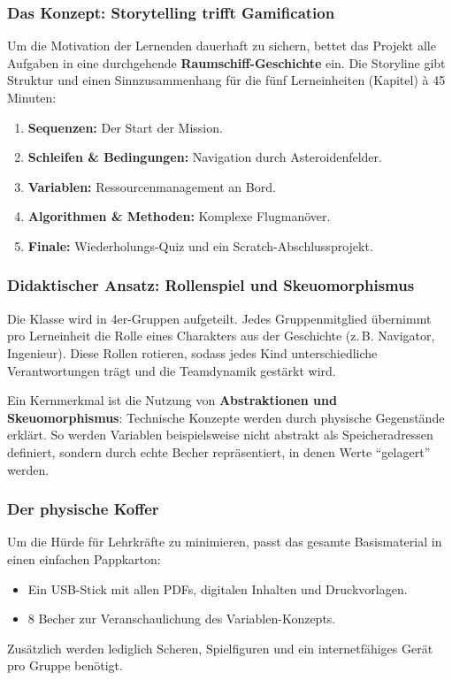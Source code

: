 \documentclass[a5paper,pagesize,10pt,bibtotoc,pointlessnumbers,
normalheadings,DIV=9,twoside=false]{scrbook}
\begin{document}
\subsubsection*{Das Konzept: Storytelling trifft Gamification}
Um die Motivation der Lernenden dauerhaft zu sichern, bettet das Projekt alle Aufgaben in eine durchgehende \textbf{Raumschiff-Geschichte} ein. Die Storyline gibt Struktur und einen Sinnzusammenhang für die fünf Lerneinheiten (Kapitel) à 45 Minuten:

\begin{enumerate}
    \item \textbf{Sequenzen:} Der Start der Mission.
    \item \textbf{Schleifen \& Bedingungen:} Navigation durch Asteroidenfelder.
    \item \textbf{Variablen:} Ressourcenmanagement an Bord.
    \item \textbf{Algorithmen \& Methoden:} Komplexe Flugmanöver.
    \item \textbf{Finale:} Wiederholungs-Quiz und ein Scratch-Abschluss\-projekt.
\end{enumerate}

\subsubsection*{Didaktischer Ansatz: Rollenspiel und Skeuomorphismus}
Die Klasse wird in 4er-Gruppen aufgeteilt. Jedes Gruppenmitglied übernimmt pro Lerneinheit die Rolle eines Charakters aus der Geschichte (z.\,B. Navigator, Ingenieur). Diese Rollen rotieren, sodass jedes Kind unterschiedliche Verantwortungen trägt und die Teamdynamik gestärkt wird.

Ein Kernmerkmal ist die Nutzung von \textbf{Abstraktionen und Skeuomorphismus}: Technische Konzepte werden durch physische Gegenstände erklärt. So werden Variablen beispielsweise nicht abstrakt als Speicheradressen definiert, sondern durch echte Becher repräsentiert, in denen Werte ``gelagert'' werden.

\subsubsection*{Der physische Koffer}
Um die Hürde für Lehrkräfte zu minimieren, passt das gesamte Basismaterial in einen einfachen Pappkarton:
\begin{itemize}
    \item Ein USB-Stick mit allen PDFs, digitalen Inhalten und Druckvorlagen.
    \item 8 Becher zur Veranschaulichung des Variablen-Konzepts.
\end{itemize}
Zusätzlich werden lediglich Scheren, Spielfiguren und ein internetfähiges Gerät pro Gruppe benötigt.
\end{document}
